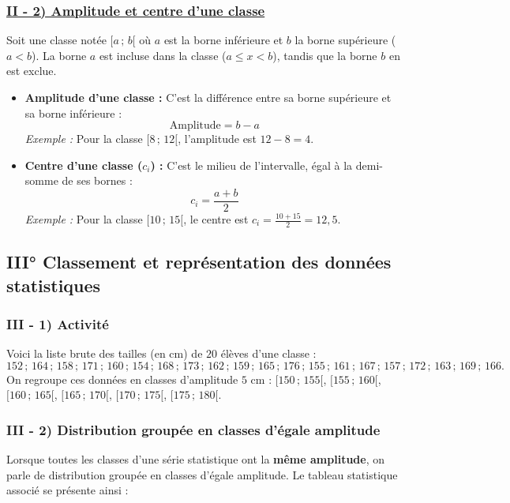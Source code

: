 \documentclass[11pt, a4paper]{article}
\begin{document}
\subsubsection*{\textcolor{accent}{\underline{II - 2) Amplitude et centre d'une classe}}}
Soit une classe notée $[a\,;\,b[$ où $a$ est la borne inférieure et $b$ la borne supérieure ($a < b$). La borne $a$ est incluse dans la classe ($a \le x < b$), tandis que la borne $b$ en est exclue.
\begin{itemize}
    \item \textbf{Amplitude d'une classe :} C'est la différence entre sa borne supérieure et sa borne inférieure :
    \[
        \text{Amplitude} = b - a
    \]
    \textit{Exemple :} Pour la classe $[8\,;\,12[$, l'amplitude est $12 - 8 = 4$.
    \item \textbf{Centre d'une classe ($c_i$) :} C'est le milieu de l'intervalle, égal à la demi-somme de ses bornes :
    \[
        c_i = \frac{a + b}{2}
    \]
    \textit{Exemple :} Pour la classe $[10\,;\,15[$, le centre est $c_i = \frac{10 + 15}{2} = 12,5$.
\end{itemize}

\subsection*{\textcolor{primary}{III° Classement et représentation des données statistiques}}

\subsubsection*{III - 1) Activité}
Voici la liste brute des tailles (en cm) de $20$ élèves d'une classe :
\[
    152 \,;\, 164 \,;\, 158 \,;\, 171 \,;\, 160 \,;\, 154 \,;\, 168 \,;\, 173 \,;\, 162 \,;\, 159 \,;\, 165 \,;\, 176 \,;\, 155 \,;\, 161 \,;\, 167 \,;\, 157 \,;\, 172 \,;\, 163 \,;\, 169 \,;\, 166.
\]
On regroupe ces données en classes d'amplitude $5\text{ cm}$ : $[150\,;\,155[$, $[155\,;\,160[$, $[160\,;\,165[$, $[165\,;\,170[$, $[170\,;\,175[$, $[175\,;\,180[$.

\subsubsection*{III - 2) Distribution groupée en classes d'égale amplitude}
Lorsque toutes les classes d'une série statistique ont la \textbf{même amplitude}, on parle de distribution groupée en classes d'égale amplitude. Le tableau statistique associé se présente ainsi :
\end{document}
